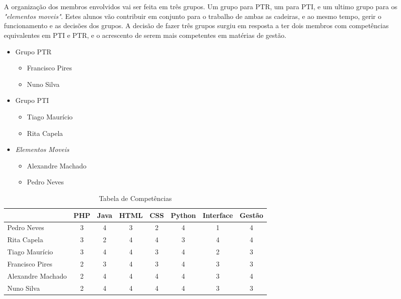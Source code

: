 \documentclass[12pt, a4paper, twoside]{report} %
\begin{document}
\\
\\
A organização dos membros envolvidos vai ser feita em três grupos.
Um grupo para PTR, um para PTI, e um ultimo grupo para os \textit {"elementos moveis"}. 
Estes alunos vão contribuir em conjunto para o trabalho de ambas as cadeiras, e ao mesmo tempo, gerir o funcionamento e as decisões dos grupos.
A decisão de fazer três grupos surgiu em resposta a ter dois membros com competências equivalentes em PTI e PTR, e o acrescento de serem mais competentes em matérias de gestão.

\begin{itemize}
\item Grupo PTR
\begin{itemize}
	\item Francisco Pires
	\item Nuno Silva
\end{itemize}
\item Grupo PTI
\begin{itemize}
	\item Tiago Maurício
	\item Rita Capela
\end{itemize}
\item \textit{Elementos Moveis}
\begin{itemize}
	\item Alexandre Machado
	\item Pedro Neves
\end{itemize}
\end{itemize}


\begin{table}[h]
\centering
\begin{tabular}{|l|c c c c c c c|}
\hline
                  & PHP & Java & HTML & CSS & Python & Interface & Gestão \\ \hline
Pedro Neves       & 3   & 4    & 3    & 2   & 4      & 1         & 4      \\ \hline
Rita Capela       & 3   & 2    & 4    & 4   & 3      & 4         & 4      \\ \hline
Tiago Maurício    & 3   & 4    & 4    & 3   & 4      & 2         & 3      \\ \hline
Francisco Pires   & 2   & 3    & 4    & 3   & 4      & 3         & 3      \\ \hline
Alexandre Machado & 2   & 4    & 4    & 4   & 4      & 3         & 4      \\ \hline
Nuno Silva        & 2   & 4    & 4    & 4   & 4      & 3         & 3      \\ \hline
\end{tabular}
\caption{Tabela de Competências}
\label{competencias}
\end{table}
\end{document}
